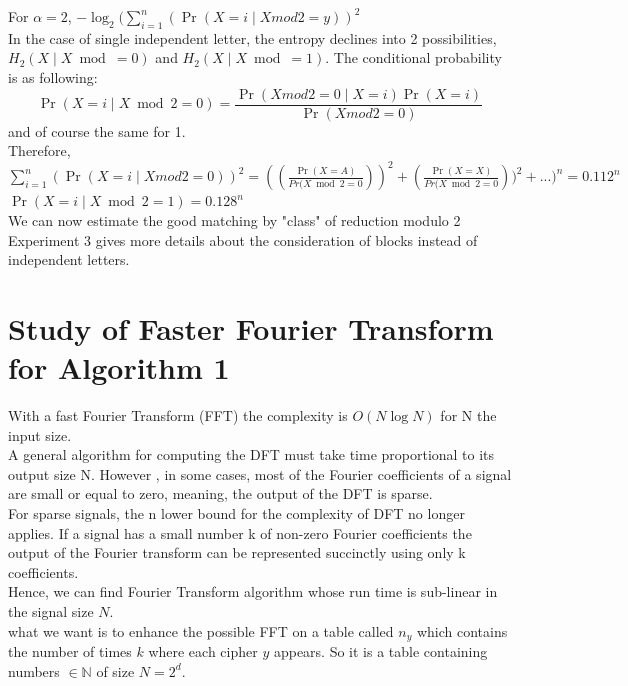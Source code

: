 \documentclass{article}
\begin{document}
For $\alpha = 2$, $-\log_{2}(\sum_{i=1}^{n}{(\Pr (X=i \mid X mod2 = y))^{2}}$\\
In the case of single independent letter, the entropy declines into 2 possibilities, $H_{2}(X \mid X \bmod = 0) $ and $H_{2}(X \mid X \bmod = 1)$. The conditional probability is as following:
$$\Pr (X=i \mid X \bmod 2 = 0 ) = \frac{\Pr(X mod 2 = 0 \mid X = i) \Pr(X=i)}{\Pr(X mod 2 =0)} $$ and of course the same for 1.\\
Therefore, $\sum_{i=1}^{n}{(\Pr (X=i \mid X mod2 = 0))^{2}} = ((\frac{\Pr(X=A)}{Pr(X \bmod 2 = 0}))^{2} + (\frac{\Pr(X=X)}{Pr(X \bmod 2 = 0}))^{2} + ... )^{n}= 0.112^{n}$\\
$\Pr (X=i \mid X \bmod 2 = 1) = 0.128^{n}$\\
We can now estimate the good matching by "class" of reduction modulo 2
Experiment 3 gives more details about the consideration of blocks instead of independent letters.

\section{Study of Faster Fourier Transform for Algorithm 1}
With a fast Fourier Transform (FFT) the complexity is $O(N\log N)$ for N the input size.\\
A general algorithm for computing the DFT must take time proportional to its output size N. However , in some cases, most of the Fourier coefficients of a signal are small or equal to zero, meaning, the output of the DFT is sparse.\\
For sparse signals, the n lower bound for the complexity of DFT no longer applies. If a signal has a small number k of non-zero Fourier coefficients the output of the Fourier transform can be represented succinctly using only k coefficients.\\
Hence, we can find Fourier Transform algorithm whose run time is sub-linear in the signal size $N$.\\
what we want is to enhance the possible FFT on a table called $n_y$ which contains the number of times $k$ where each cipher $y$ appears. So it is a table containing numbers $\in \mathbb{N}$ of size $N=2^d$.\\
\end{document}
